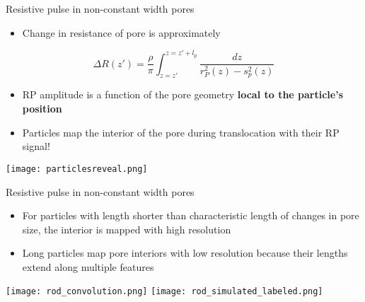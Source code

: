 \begin{frame}[c]{Resistive pulse in non-constant width pores}
	\begin{itemize}
		\item Change in resistance of pore is approximately
	\end{itemize}
	$$ \Delta R\left(z'\right)=\frac{\rho}{\pi}\int_{z=z'}^{z=z'+l_{p}}\frac{dz}{r_{P}^{2}\left(z\right)-s_{p}^{2}\left(z\right)} $$
	\begin{itemize}
		\item RP amplitude is a function of the pore geometry \textbf{local to the particle's position}
		\item Particles map the interior of the pore during translocation with their RP signal!
	\end{itemize}
	
	{\centering
		\texttt{[image: particlesreveal.png]} \\
		\par
	}
	
	
	
\end{frame}



\begin{frame}[c]{Resistive pulse in non-constant width pores}
	\begin{itemize}
		\item For particles with length shorter than characteristic length of changes in pore size, the interior is mapped with high resolution
		\item Long particles map pore interiors with low resolution because their lengths extend along multiple features
	\end{itemize}
	
	{\centering
		\texttt{[image: rod\_convolution.png]}
		\hspace{.1in}
		\texttt{[image: rod\_simulated\_labeled.png]}
		\par
	}
	
\end{frame}




